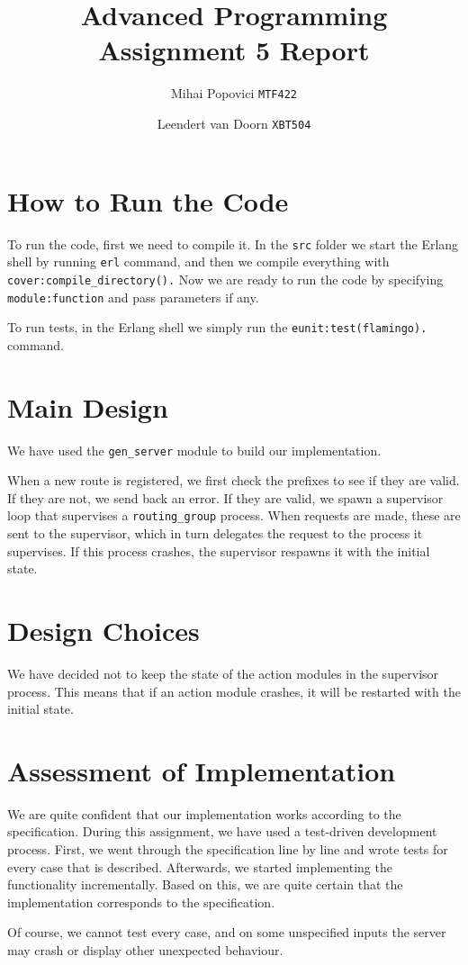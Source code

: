\documentclass{article}
\title{Advanced Programming Assignment 5 Report}
\author{Mihai Popovici \texttt{MTF422} \and Leendert van Doorn \texttt{XBT504}}
\begin{document}
	
	\maketitle	
	
	\section{How to Run the Code}
	To run the code, first we need to compile it. In the \texttt{src} folder we start the Erlang shell by running \texttt{erl} command, and then we compile everything with \texttt{cover:compile\_directory().}
	Now we are ready to run the code by specifying \texttt{module:function} and pass parameters if any.
	
	To run tests, in the Erlang shell we simply run the \texttt{eunit:test(flamingo).} command.
	
	\section{Main Design}
	We have used the \texttt{gen\_server} module to build our implementation. 
	
	When a new route is registered, we first check the prefixes to see if they are valid. If they are not, we send back an error. If they are valid, we spawn a supervisor loop that supervises a \texttt{routing\_group} process. When requests are made, these are sent to the supervisor, which in turn delegates the request to the process it supervises. If this process crashes, the supervisor respawns it with the initial state. 
	
	\section{Design Choices}
	We have decided not to keep the state of the action modules in the supervisor process. This means that if an action module crashes, it will be restarted with the initial state.
	
	\section{Assessment of Implementation}
	We are quite confident that our implementation works according to the specification. During this assignment, we have used a test-driven development process. First, we went through the specification line by line and wrote tests for every case that is described. Afterwards, we started implementing the functionality incrementally. Based on this, we are quite certain that the implementation corresponds to the specification.
	
	Of course, we cannot test every case, and on some unspecified inputs the server may crash or display other unexpected behaviour. 
	
\end{document}
